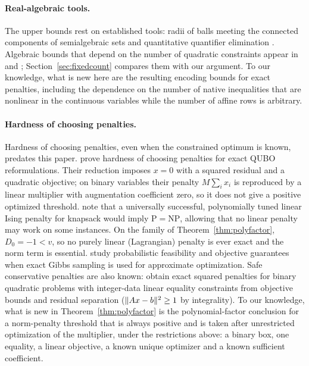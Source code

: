 \paragraph{Real-algebraic tools.}
The upper bounds rest on established tools: radii of balls meeting the
connected components of semialgebraic sets \citep{BasuRoy2010} and
quantitative quantifier elimination \citep{BasuPollackRoy2006,Basu2014}.
Algebraic bounds that depend on the number of quadratic constraints
appear in \citet{GrigorievPasechnik2005} and \citet{KammingaRudolph2025};
Section~\ref{sec:fixedcount} compares them with our argument. To our
knowledge, what is new here are the resulting encoding bounds for exact
penalties, including the dependence on the number of native inequalities
that are nonlinear in the continuous variables while the number of
affine rows is arbitrary.

\paragraph{Hardness of choosing penalties.}
Hardness of choosing penalties, even when the constrained optimum is
known, predates this paper. \citet[Section~IV.A, Lemma~1]{Alessandroni2025}
prove hardness of choosing penalties for exact QUBO reformulations. Their
reduction imposes $x=0$ with a squared residual and a quadratic
objective; on binary variables their penalty $M\sum_ix_i$ is reproduced
by a linear multiplier with augmentation coefficient zero, so it does not
give a positive optimized threshold. \citet[Section~2.2]{Mirkarimi2024}
note that a universally successful, polynomially tuned linear Ising
penalty for knapsack would imply $\mathrm P=\mathrm{NP}$, allowing that no
linear penalty may work on some instances. On the family of
Theorem~\ref{thm:polyfactor}, $D_0=-1<v$, so
no purely linear (Lagrangian) penalty is ever exact and the norm term is
essential. \citet[Definition~1 and Theorem~2]{Alessandroni2026} study
probabilistic feasibility and objective guarantees when exact Gibbs
sampling is used for approximate optimization. Safe conservative
penalties are also known: \citet[Sections~5--6]{GusmeroliWiegele2022}
obtain exact squared penalties for binary quadratic problems with
integer-data linear equality constraints from objective bounds and
residual separation ($\lVert Ax-b\rVert^2\ge1$ by integrality). To our
knowledge, what is new in Theorem~\ref{thm:polyfactor} is the polynomial-factor conclusion for a
norm-penalty threshold that is always positive and is taken after
unrestricted optimization of the multiplier, under the restrictions
above: a binary box, one equality, a linear objective, a known unique
optimizer and a known sufficient coefficient.

